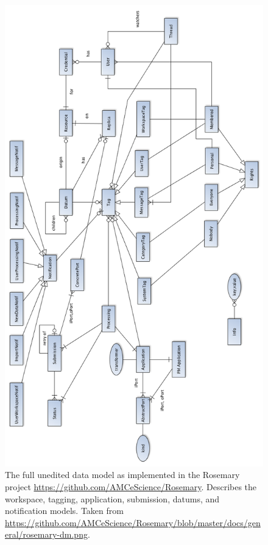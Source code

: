 \begin{figure}[ht]
	\centering
	\includegraphics[width=0.54\linewidth]{images/datamodel-unedited}
	\caption{
		The full unedited data model as implemented in the Rosemary project \protect\url{https://github.com/AMCeScience/Rosemary}.
		Describes the workspace, tagging, application, submission, datums, and notification models.
		Taken from \protect\url{https://github.com/AMCeScience/Rosemary/blob/master/docs/general/rosemary-dm.png}.
	}
	\label{fig:unedited-rosemary-dm}
\end{figure}